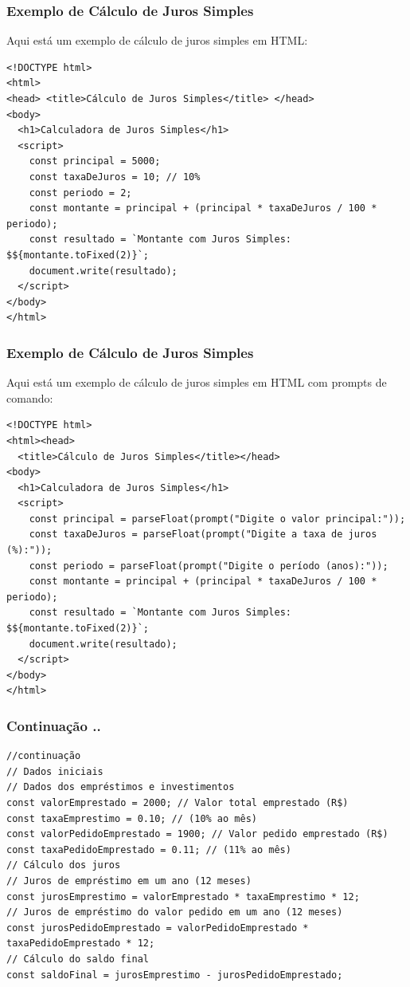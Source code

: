 \documentclass[13pt, xcolor={dvipsnames,svgnames}, portuguese]{beamer}
\begin{document}
\begin{frame}[fragile]
\frametitle{Exemplo de Cálculo de Juros Simples}

Aqui está um exemplo de cálculo de juros simples em HTML:

\begin{verbatim}
<!DOCTYPE html>
<html>
<head> <title>Cálculo de Juros Simples</title> </head>
<body>
  <h1>Calculadora de Juros Simples</h1>
  <script>
    const principal = 5000;
    const taxaDeJuros = 10; // 10%
    const periodo = 2;
    const montante = principal + (principal * taxaDeJuros / 100 * periodo);
    const resultado = `Montante com Juros Simples: $${montante.toFixed(2)}`;
    document.write(resultado);
  </script>
</body>
</html>
\end{verbatim}

\end{frame}
\begin{frame}[fragile]
\frametitle{Exemplo de Cálculo de Juros Simples}
Aqui está um exemplo de cálculo de juros simples em HTML com prompts de comando:

\begin{verbatim}
<!DOCTYPE html>
<html><head>
  <title>Cálculo de Juros Simples</title></head>
<body>
  <h1>Calculadora de Juros Simples</h1>
  <script>
    const principal = parseFloat(prompt("Digite o valor principal:"));
    const taxaDeJuros = parseFloat(prompt("Digite a taxa de juros (%):"));
    const periodo = parseFloat(prompt("Digite o período (anos):"));
    const montante = principal + (principal * taxaDeJuros / 100 * periodo);
    const resultado = `Montante com Juros Simples: $${montante.toFixed(2)}`;
    document.write(resultado);
  </script>
</body>
</html>
\end{verbatim}

\end{frame}
\begin{frame}[fragile]
\frametitle{Continuação ..}

\begin{verbatim}
//continuação
// Dados iniciais
// Dados dos empréstimos e investimentos
const valorEmprestado = 2000; // Valor total emprestado (R$)
const taxaEmprestimo = 0.10; // (10% ao mês)
const valorPedidoEmprestado = 1900; // Valor pedido emprestado (R$)
const taxaPedidoEmprestado = 0.11; // (11% ao mês)
// Cálculo dos juros
// Juros de empréstimo em um ano (12 meses)
const jurosEmprestimo = valorEmprestado * taxaEmprestimo * 12; 
// Juros de empréstimo do valor pedido em um ano (12 meses)
const jurosPedidoEmprestado = valorPedidoEmprestado * taxaPedidoEmprestado * 12; 
// Cálculo do saldo final
const saldoFinal = jurosEmprestimo - jurosPedidoEmprestado;

\end{verbatim}

\end{frame}
\end{document}
